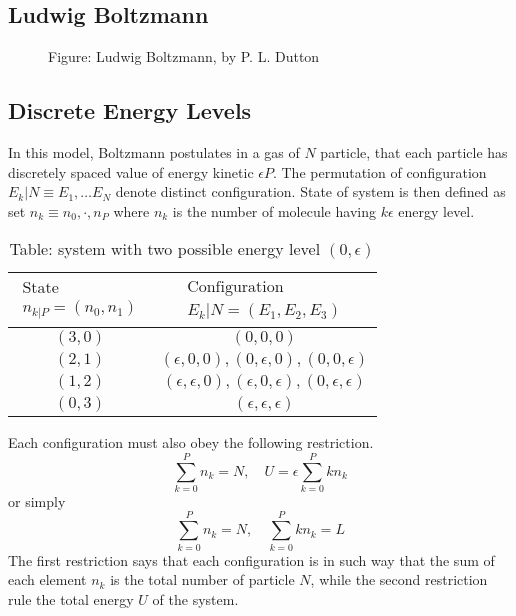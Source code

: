 \documentclass[../../../Main.tex]{subfiles}
\begin{document}
\subsection*{Ludwig Boltzmann}
\begin{figure*}[h]
    \centering
    \caption*{Figure: Ludwig Boltzmann, by P. L. Dutton}
\end{figure*}
\subsection*{Discrete Energy Levels}
In this model, Boltzmann postulates in a gas of $N$ particle, that each particle has discretely spaced value of energy kinetic $\epsilon P$. The permutation of configuration $E_k|N\equiv E_1,\dots E_N$ denote distinct configuration. State of system is then defined as set $n_k\equiv n_0,\cdot, n_P$ where $n_k$ is the number of molecule having $k\epsilon$ energy level.

\begin{table}[h]
    \centering
    \caption*{Table: system with two possible energy level $(0, \epsilon)$}
    \begin{tabular}{cc} 
        \toprule
        $\begin{array}{c}\text{State} \\n_{k|P}=(n_0,n_1)\end{array}$  &  $\begin{array}{c}\text{Configuration} \\ E_k|N=(E_1 , E_2 , E_3 )\end{array}$ \\
        \midrule
        $(3, 0)$&$(0, 0, 0)$\\
        $(2, 1)$&$(\epsilon, 0, 0), (0, \epsilon, 0), (0, 0, \epsilon)$\\
        $(1, 2)$&$(\epsilon, \epsilon, 0), (\epsilon, 0, \epsilon), (0, \epsilon, \epsilon)$\\
        $(0, 3)$&$(\epsilon, \epsilon, \epsilon)$\\
        \bottomrule
    \end{tabular}
\end{table}

Each configuration must also obey the following restriction.
\begin{equation*}
    \sum_{k=0}^{P}n_k=N,\quad U=\epsilon\sum_{k=0}^{P} kn_k
\end{equation*}
or simply
\begin{equation*}
    \sum_{k=0}^{P}n_k=N,\quad \sum_{k=0}^{P} kn_k=L
\end{equation*}
The first restriction says that each configuration is in such way that the sum of each element $n_k$ is the total number of particle $N$, while the second restriction rule the total energy $U$ of the system.
\end{document}
